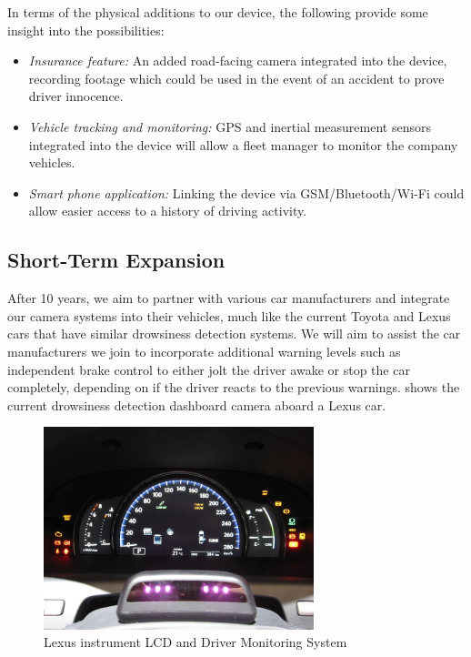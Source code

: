 In terms of the physical additions to our device, the following provide some insight into the possibilities:
\begin{itemize}
\item \textit{Insurance feature:} An added road-facing camera integrated into the device, recording footage which could be used in the event of an accident to prove driver innocence.

\item \textit{Vehicle tracking and monitoring:} GPS and inertial measurement sensors integrated into the device will allow a fleet manager to monitor the company vehicles.

\item \textit{Smart phone application:} Linking the device via GSM/Bluetooth/Wi-Fi could allow easier access to a history of driving activity.
\end{itemize}

\subsection{Short-Term Expansion}
After 10 years, we aim to partner with various car manufacturers and integrate our camera systems into their vehicles, much like the current Toyota \cite{toyota} and Lexus \cite{lexus} cars that have similar drowsiness detection systems. We will aim to assist the car manufacturers we join to incorporate additional warning levels such as independent brake control to either jolt the driver awake or stop the car completely, depending on if the driver reacts to the previous warnings.  shows the current drowsiness detection dashboard camera aboard a Lexus car.

\begin{figure}[H]
\centering
\includegraphics[width=0.7\textwidth]{images/lexus_monitoring}
\vskip10pt
\caption[Lexus Dashboard]{Lexus instrument LCD and Driver Monitoring System \cite{lexusdash}}
\label{fig:lexusdash}
\end{figure}

